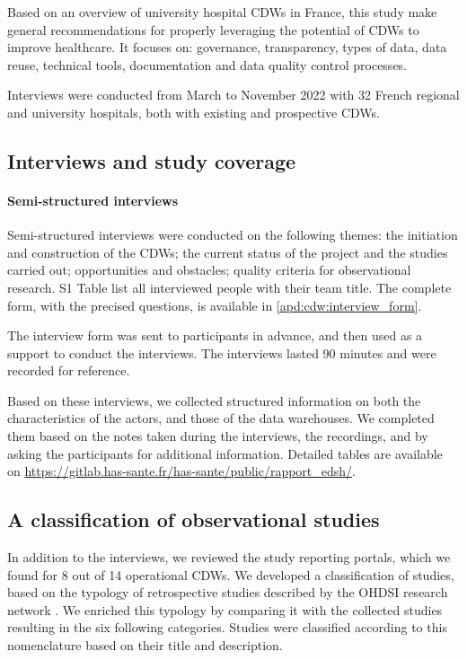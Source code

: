\documentclass[french,12pt,twoside,a4paper]{book}
\begin{document}
Based on an overview of university hospital CDWs in France, this study make
general recommendations for properly leveraging the potential of CDWs to improve
healthcare. It focuses on: governance, transparency, types of
data, data reuse, technical tools, documentation and data quality control
processes.

Interviews were conducted from March to November 2022 with 32 French regional
and university hospitals, both with existing and prospective CDWs.

\subsection{Interviews and study coverage}\label{subsec:cdw:interviews}

\paragraph{Semi-structured interviews}

Semi-structured interviews were conducted on the following
themes: the initiation and construction of the CDWs; the current status of the
project and the studies carried out; opportunities and obstacles; quality
criteria for observational research. S1 Table list
all interviewed people with their team title. The complete form, with the
precised questions, is available in \ref{apd:cdw:interview_form}.

The interview form was sent to participants in advance, and then used as a
support to conduct the interviews. The interviews lasted 90 minutes and were
recorded for reference.

Based on these interviews, we collected structured information on both the
characteristics of the actors, and those of the data warehouses. We completed
them based on the notes taken during the interviews, the recordings, and by
asking the participants for additional information. Detailed tables are
available on \url{https://gitlab.has-sante.fr/has-sante/public/rapport_edsh/}.

\subsection{A classification of observational studies}%
\label{subsec:cdw:classification}%

In addition to the interviews, we reviewed the study reporting portals, which we
found for 8 out of 14 operational CDWs. We developed a classification of
studies, based on the typology of retrospective studies described by the OHDSI
research network \citep{schuemie_book_2021}. We enriched this typology by
comparing it with the collected studies resulting in the six following
categories. Studies were classified according to this nomenclature based on
their title and description.
\end{document}
